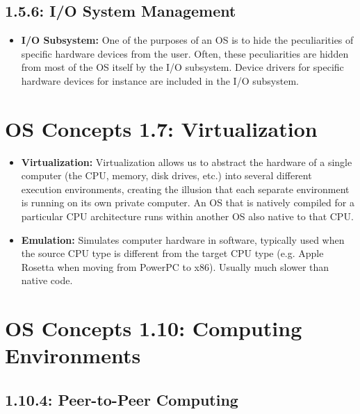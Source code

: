 \documentclass[12pt]{article}
\begin{document}
\subsection*{1.5.6: I/O System Management}

\begin{itemize}
    \item \textbf{I/O Subsystem:} One of the purposes of an OS is to hide the peculiarities of specific hardware devices from the user. Often, these peculiarities are hidden from most of the OS itself by the I/O subsystem. Device drivers for specific hardware devices for instance are included in the I/O subsystem.
\end{itemize}

\section*{OS Concepts 1.7: Virtualization}

\begin{itemize}
    \item \textbf{Virtualization:} Virtualization allows us to abstract the hardware of a single computer (the CPU, memory, disk drives, etc.) into several different execution environments, creating the illusion that each separate environment is running on its own private computer. An OS that is natively compiled for a particular CPU architecture runs within another OS also native to that CPU.
    \item \textbf{Emulation:} Simulates computer hardware in software, typically used when the source CPU type is different from the target CPU type (e.g. Apple Rosetta when moving from PowerPC to x86). Usually much slower than native code.
\end{itemize}

\section*{OS Concepts 1.10: Computing Environments}

\subsection*{1.10.4: Peer-to-Peer Computing}
\end{document}
